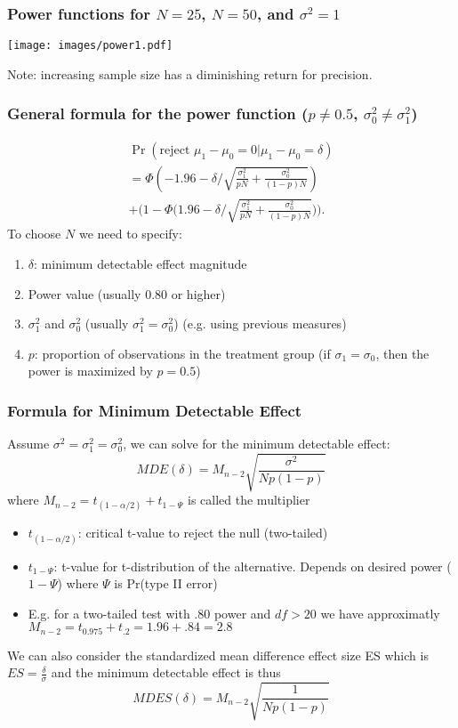 \documentclass{beamer}
\numberwithin{equation}{section}
\begin{document}
\begin{frame}
  \frametitle{Power functions for $N=25$, $N=50$, and $\sigma^2=1$}
  \centering
  \texttt{[image: images/power1.pdf]}\\
  \begin{small}
Note: increasing sample size has a diminishing return for precision.
\end{small}
\end{frame}

\begin{frame}
  \frametitle{General formula for the power function ($p\neq 0.5$, $\sigma_0^2\neq \sigma_1^2$)}
  \small
\begin{multline*}
\Pr\left(\mbox{reject } \mu_1-\mu_0=0 | \mu_1-\mu_0=\delta\right)\\
= \Phi\left(-1.96-\delta\Bigg/\sqrt{\displaystyle\frac{\sigma_1^2}{p N}+\displaystyle\frac{\sigma_0^2}{(1-p)N}}\right)\\ +
\Bigg(1-\Phi\Bigg(1.96-\delta\Bigg/\sqrt{\displaystyle\frac{\sigma_1^2}{p N}+\displaystyle\frac{\sigma_0^2}{(1-p)N}}\Bigg)\Bigg).
\end{multline*}
To choose $N$ we need to specify:
\begin{enumerate}
\item $\delta$: \alert{minimum detectable effect} magnitude
\item Power value (usually 0.80 or higher)
\item $\sigma_1^2$ and $\sigma_0^2$ (usually $\sigma_1^2=\sigma_0^2$) (e.g. using previous measures)
\item $p$: proportion of observations in the treatment group
(if $\sigma_1=\sigma_0$, then the power is maximized by $p=0.5$)
\end{enumerate}
\end{frame}




\begin{frame}
  \frametitle{Formula for Minimum Detectable Effect}
  \small
Assume $\sigma^2=\sigma_1^2=\sigma_0^2$, we can solve for the \alert{minimum detectable effect}:
\[
MDE(\delta) = M_{n-2} \sqrt{\frac{\sigma^2}{N p(1-p)}}
\]
where $M_{n-2}=t_{(1-\alpha/2)}+t_{1-\Psi}$ is called the \alert{multiplier}
\begin{itemize}
  \item $t_{(1-\alpha/2)}$: critical t-value to reject the null (two-tailed)
  \item $t_{1-\Psi}$: t-value for t-distribution of the alternative. Depends on desired power ($1-\Psi$) where $\Psi$ is Pr(type II error)
  \item E.g. for a two-tailed test with .80 power and $df>20$ we have approximatly \\
  $M_{n-2}=t_{0.975}+t_{.2}=1.96 + .84 = 2.8$
\end{itemize}
We can also consider the  \alert{standardized mean difference effect size} ES which is $ES=\frac{\delta}{\sigma}$ and the minimum detectable effect is thus
\[
MDES(\delta) = M_{n-2} \sqrt{\frac{1}{N p(1-p)}}
\]
\end{frame}
\end{document}
